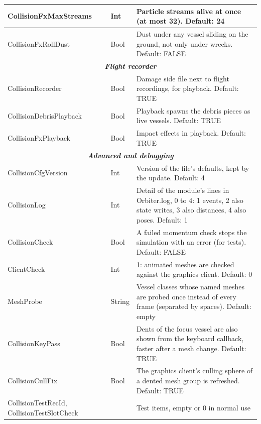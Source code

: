 \documentclass[Orbiter User Manual.tex]{subfiles}
\begin{document}
\begin{longtable}{ |p{}|p{}|p{}| }
	\hline\rule{0pt}{2ex}
	CollisionFxMaxStreams & Int & Particle streams alive at once (at most 32). Default: 24\\
	\hline\rule{0pt}{2ex}
	CollisionFxRollDust & Bool & Dust under any vessel sliding on the ground, not only under wrecks. Default: FALSE\\
	\hline
	\multicolumn{3}{|c|}{\rule{0pt}{2ex}\textbf{\textit{Flight recorder}}}\\
	\hline\rule{0pt}{2ex}
	CollisionRecorder & Bool & Damage side file next to flight recordings, for playback. Default: TRUE\\
	\hline\rule{0pt}{2ex}
	CollisionDebrisPlayback & Bool & Playback spawns the debris pieces as live vessels. Default: TRUE\\
	\hline\rule{0pt}{2ex}
	CollisionFxPlayback & Bool & Impact effects in playback. Default: TRUE\\
	\hline
	\multicolumn{3}{|c|}{\rule{0pt}{2ex}\textbf{\textit{Advanced and debugging}}}\\
	\hline\rule{0pt}{2ex}
	CollisionCfgVersion & Int & Version of the file's defaults, kept by the update. Default: 4\\
	\hline\rule{0pt}{2ex}
	CollisionLog & Int & Detail of the module's lines in Orbiter.log, 0 to 4: 1 events, 2 also state writes, 3 also distances, 4 also poses. Default: 1\\
	\hline\rule{0pt}{2ex}
	CollisionCheck & Bool & A failed momentum check stops the simulation with an error (for tests). Default: FALSE\\
	\hline\rule{0pt}{2ex}
	ClientCheck & Int & 1: animated meshes are checked against the graphics client. Default: 0\\
	\hline\rule{0pt}{2ex}
	MeshProbe & String & Vessel classes whose named meshes are probed once instead of every frame (separated by spaces). Default: empty\\
	\hline\rule{0pt}{2ex}
	CollisionKeyPass & Bool & Dents of the focus vessel are also shown from the keyboard callback, faster after a mesh change. Default: TRUE\\
	\hline\rule{0pt}{2ex}
	CollisionCullFix & Bool & The graphics client's culling sphere of a dented mesh group is refreshed. Default: TRUE\\
	\hline\rule{0pt}{2ex}
	CollisionTestRecId, CollisionTestSlotCheck & & Test items, empty or 0 in normal use\\
	\hline
	\end{longtable}
\end{document}
